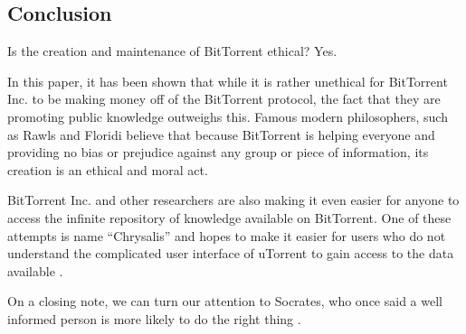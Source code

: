 \documentclass[11pt]{article}
\begin{document}
\begin{multicols}{2}
\section{Conclusion}

Is the creation and maintenance of BitTorrent ethical? Yes.

In this paper, it has been shown that while it is rather unethical for BitTorrent Inc. to be making money off of the BitTorrent protocol, the fact that they are promoting public knowledge outweighs this. Famous modern philosophers, such as Rawls and Floridi believe that because BitTorrent is helping everyone and providing no bias or prejudice against any group or piece of information, its creation is an ethical and moral act.

BitTorrent Inc. and other researchers are also making it even easier for anyone to access the infinite repository of knowledge available on BitTorrent. One of these attempts is name ``Chrysalis'' and hopes to make it easier for users who do not understand the complicated user interface of uTorrent to gain access to the data available \cite{chrysalis}. 

On a closing note, we can turn our attention to Socrates, who once said a well informed person is more likely to do the right thing \cite{nphr}.

\end{multicols}

\newpage
\singlespacing


\end{document}
